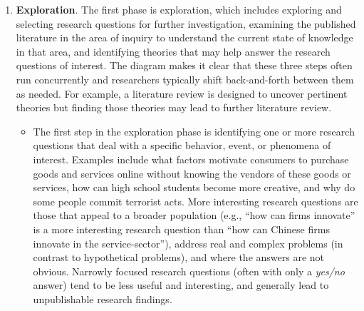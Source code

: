 \begin{enumerate}
	\item \textbf{Exploration}. The first phase is exploration, which includes exploring and selecting research questions for further investigation, examining the published literature in the area of	inquiry to understand the current state of knowledge in that area, and identifying theories that may help answer the research questions of interest. The diagram makes it clear that these three steps often run concurrently and researchers typically shift back-and-forth between them as needed. For example, a literature review is designed to uncover pertinent theories but finding those theories may lead to further literature review.

\begin{itemize}
	\item The first step in the exploration phase is identifying one or more research questions 	that deal with a specific behavior, event, or phenomena of interest. Examples include what factors motivate consumers to purchase goods and services online without knowing the vendors of these goods or services, how can high school students become more creative, and why do some people commit terrorist acts. More 	interesting research questions are those that appeal to a broader population (e.g., ``how can firms innovate'' is a more interesting research question than ``how can Chinese firms innovate in the service-sector''), address real and complex problems (in contrast to hypothetical problems), and where the answers are not obvious. Narrowly focused research questions (often with only a \textit{yes/no} answer) tend to be less useful and interesting, and generally lead to unpublishable research findings.


\end{itemize}
\end{enumerate}
